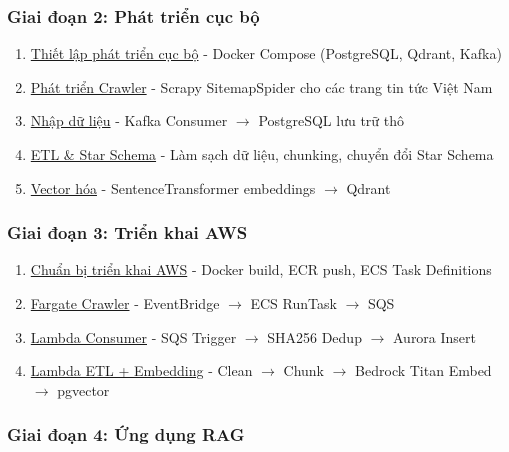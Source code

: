 \hypertarget{giai-ux111oux1ea1n-2-phuxe1t-triux1ec3n-cux1ee5c-bux1ed9}{%
\subsubsection{Giai đoạn 2: Phát triển cục
bộ}}

\begin{enumerate}
\def\labelenumi{\arabic{enumi}.}
\setcounter{enumi}{3}
\tightlist
\item
  \href{5.4-Local-Dev/}{Thiết lập phát triển cục bộ} - Docker Compose
  (PostgreSQL, Qdrant, Kafka)
\item
  \href{5.5-Crawler/}{Phát triển Crawler} - Scrapy SitemapSpider cho các
  trang tin tức Việt Nam
\item
  \href{5.6-Ingestion/}{Nhập dữ liệu} - Kafka Consumer \(\rightarrow\)
  PostgreSQL lưu trữ thô
\item
  \href{5.7-ETL/}{ETL \& Star Schema} - Làm sạch dữ liệu, chunking,
  chuyển đổi Star Schema
\item
  \href{5.8-Vectorize/}{Vector hóa} - SentenceTransformer embeddings
  \(\rightarrow\) Qdrant
\end{enumerate}

\hypertarget{giai-ux111oux1ea1n-3-triux1ec3n-khai-aws}{%
\subsubsection{Giai đoạn 3: Triển khai
AWS}}

\begin{enumerate}
\def\labelenumi{\arabic{enumi}.}
\setcounter{enumi}{8}
\tightlist
\item
  \href{5.9-AWS-Deploy/}{Chuẩn bị triển khai AWS} - Docker build, ECR
  push, ECS Task Definitions
\item
  \href{5.10-Fargate-Crawler/}{Fargate Crawler} - EventBridge
  \(\rightarrow\) ECS RunTask \(\rightarrow\) SQS
\item
  \href{5.11-Lambda-Consumer/}{Lambda Consumer} - SQS Trigger
  \(\rightarrow\) SHA256 Dedup \(\rightarrow\) Aurora Insert
\item
  \href{5.12-Lambda-ETL/}{Lambda ETL + Embedding} - Clean
  \(\rightarrow\) Chunk \(\rightarrow\) Bedrock Titan Embed
  \(\rightarrow\) pgvector
\end{enumerate}

\hypertarget{giai-ux111oux1ea1n-4-ux1ee9ng-dux1ee5ng-rag}{%
\subsubsection{Giai đoạn 4: Ứng dụng
RAG}}

